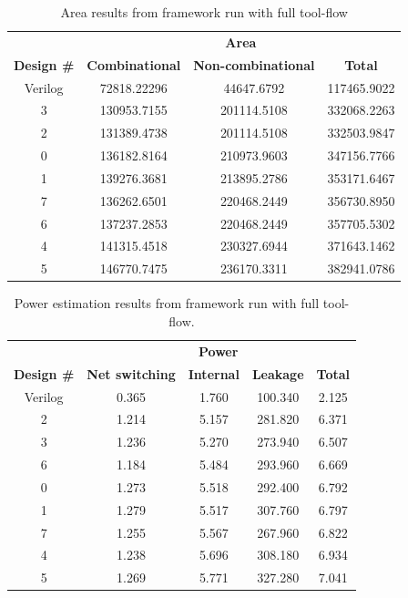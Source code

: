 \begin{table}[hbtp]
    \centering
    \begin{tabular}{cccc}
    & \multicolumn{3}{c}{\textbf{Area}} \\
    \cline{2-4}
    \textbf{Design \#} & \textbf{Combinational} & \textbf{Non-combinational} & \textbf{Total} \\
    \toprule
    Verilog & 72818.22296 & 44647.6792 & 117465.9022 \\
    3 & 130953.7155 & 201114.5108 & 332068.2263 \\
    2 & 131389.4738 & 201114.5108 & 332503.9847 \\
    0 & 136182.8164 & 210973.9603 & 347156.7766 \\
    1 & 139276.3681 & 213895.2786 & 353171.6467 \\
    7 & 136262.6501 & 220468.2449 & 356730.8950 \\
    6 & 137237.2853 & 220468.2449 & 357705.5302 \\
    4 & 141315.4518 & 230327.6944 & 371643.1462 \\
    5 & 146770.7475 & 236170.3311 & 382941.0786 \\
    \bottomrule
    \end{tabular}
    \caption{Area results from framework run with full tool-flow}
    \label{tab:resultgraphareaframeworkrun2}
\end{table}

\begin{table}[hbtp]
    \centering
    \begin{tabular}{ccccc}
    & \multicolumn{4}{c}{\textbf{Power}} \\
    \cline{2-5}
    \textbf{Design \#} & \textbf{Net switching} & \textbf{Internal} & \textbf{Leakage} & \textbf{Total} \\
    \toprule
    Verilog & 0.365 & 1.760 & 100.340 & 2.125 \\
    2 & 1.214 & 5.157 & 281.820 & 6.371 \\
    3 & 1.236 & 5.270 & 273.940 & 6.507 \\
    6 & 1.184 & 5.484 & 293.960 & 6.669 \\
    0 & 1.273 & 5.518 & 292.400 & 6.792 \\
    1 & 1.279 & 5.517 & 307.760 & 6.797 \\
    7 & 1.255 & 5.567 & 267.960 & 6.822 \\
    4 & 1.238 & 5.696 & 308.180 & 6.934 \\
    5 & 1.269 & 5.771 & 327.280 & 7.041 \\
    \bottomrule
    \end{tabular}
    \caption{Power estimation results from framework run with full tool-flow.}
    \label{tab:resultgraphpowerframeworkrun2}
\end{table}

